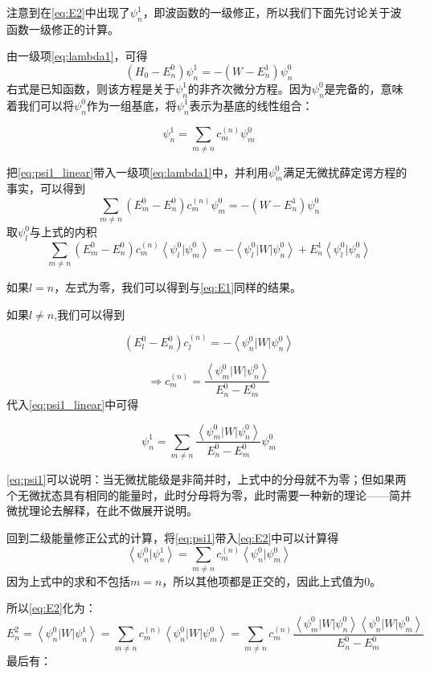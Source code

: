注意到在\cref{eq:E2}中出现了$\psi_n^1$，即波函数的一级修正，所以我们下面先讨论关于波函数一级修正的计算。

由一级项\cref{eq:lambda1}，可得
$$
(H_0 -E_n^0)\psi_n^1 = -(W - E_n^1) \psi_n^0
$$
右式是已知函数，则该方程是关于$\psi_n^1$的非齐次微分方程。因为$\psi_n^0$是完备的，意味着我们可以将$\psi_n^0$作为一组基底，将$\psi_n^1$表示为基底的线性组合：

\begin{equation}
	\psi_n^1 = \sum_{m\ne n} c_m^{(n)} \psi_m^0
	\label{eq:psi1_linear}
\end{equation}

把\cref{eq:psi1_linear}带入一级项\cref{eq:lambda1}中，并利用$\psi_m^0$满足无微扰薛定谔方程的事实，可以得到
$$
\sum_{m\ne n} (E_m^0 -E_n^0)c_m^{(n)} \psi_m^0
=
-(W- E_n^1)\psi_n^0
$$
取$\psi_l^0$与上式的内积
$$
\sum_{m \ne n} (E_m^0 -E_n^0)c_m^{(n)} 
\left \langle  \psi_l^0 |\psi_m ^0 \right \rangle 
=
-\left \langle \psi _l^0 |W| \psi_n^0 \right \rangle 
+E_n^1
\left \langle \psi _l^0 | \psi_n^0  \right \rangle 
$$

如果$l=n$，左式为零，我们可以得到与\cref{eq:E1}同样的结果。


如果$l\ne n$,我们可以得到

$$
(E_l^0- E_n^0) c_l^{(n)}
=-\left \langle \psi_n^0 | W | \psi_n^0  \right \rangle
$$

$$
\Rightarrow
c_m^{(n)}
=\frac{\left \langle \psi_m^0 | W | \psi_n^0  \right \rangle}{E_n^0 -E_m^0}
$$
代入\cref{eq:psi1_linear}中可得

\begin{equation}
	\psi_n^1 = \sum_{m\ne n} \frac{\left \langle \psi_m^0 | W | \psi_n^0  \right \rangle}{E_n^0 -E_m^0} \psi_m^0
	\label{eq:psi1}
\end{equation}

\cref{eq:psi1}可以说明：当无微扰能级是非简并时，上式中的分母就不为零；但如果两个无微扰态具有相同的能量时，此时分母将为零，此时需要一种新的理论——简并微扰理论去解释，在此不做展开说明。

回到二级能量修正公式的计算，将\cref{eq:psi1}带入\cref{eq:E2}中可以计算得
$$
\left \langle  \psi_n^0| \psi_n^1 \right \rangle 
=
\sum_{m\ne n} c_m^{(n)} \left \langle  \psi_n^0| \psi_m^0 \right \rangle  
$$
因为上式中的求和不包括$m=n$，所以其他项都是正交的，因此上式值为0。

所以\cref{eq:E2}化为：
$$
E_n^2 =
\left \langle  \psi_n^0 \bigg| W \bigg | \psi_n^1 \right \rangle 
= \sum_{m\ne n} c_m^{(n)} \left \langle  \psi_n^0|W | \psi_m^0 \right \rangle 
=
\sum_{m\ne n} c_m^{(n)} \frac{\left \langle  \psi_m^0|W | \psi_n^0 \right \rangle \left \langle  \psi_n^0|W | \psi_m^0 \right \rangle }{E_n^0 -E_m^0}
$$	
最后有：

